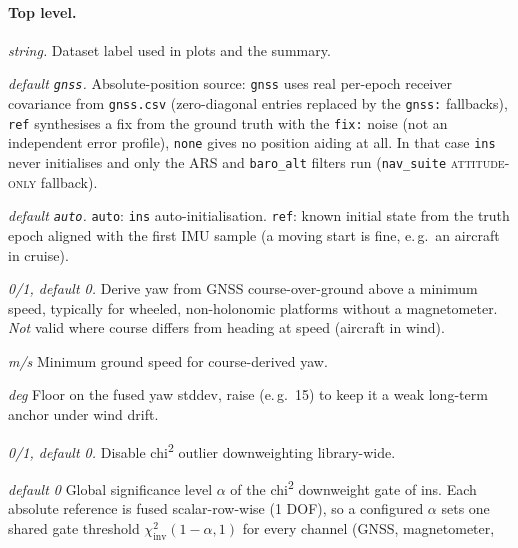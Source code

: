 \documentclass[11pt,a4paper]{article}
\newcommand{\code}[1]{\texttt{#1}}
\begin{document}
\paragraph{Top level.}
\begin{description}\setlength\itemsep{0pt}
  \item[\code{name}] \emph{string.} Dataset label used in plots and the summary.
  \item[\code{aiding}] \emph{default \code{gnss}.} Absolute-position source:
    \code{gnss} uses real per-epoch receiver covariance from \code{gnss.csv}
    (zero-diagonal entries replaced by the \code{gnss:} fallbacks), \code{ref}
    synthesises a fix from the ground truth with the \code{fix:} noise (not an
    independent error profile), \code{none} gives no position aiding at all.
    In that case \code{ins} never initialises and only the ARS and
    \code{baro\_\allowbreak{}alt} filters run (\code{nav\_\allowbreak{}suite}
    \textsc{attitude-only} fallback).
  \item[\code{init}] \emph{default \code{auto}.} \code{auto}: \code{ins}
    auto-initialisation. \code{ref}: known initial state from the truth epoch
    aligned with the first IMU sample (a moving start is fine, e.\,g.\ an aircraft
    in cruise).
  \item[\code{automotive\_\allowbreak{}mode}] \emph{0/1, default 0.} Derive yaw from GNSS
    course-over-ground above a minimum speed, typically for wheeled,
    non-holonomic platforms without a magnetometer. \emph{Not} valid where
    course differs from heading at speed (aircraft in wind).
  \item[\code{automotive\_\allowbreak{}min\_\allowbreak{}speed\_\allowbreak{}mps}] \emph{m/s}
    Minimum ground speed for course-derived yaw.
  \item[\code{automotive\_\allowbreak{}min\_\allowbreak{}yaw\_\allowbreak{}stddev\_\allowbreak{}deg}] \emph{deg}
    Floor on the fused yaw stddev, raise (e.\,g.\ 15) to keep it a weak long-term
    anchor under wind drift.
  \item[\code{chi2\_\allowbreak{}disable}] \emph{0/1, default 0.} Disable chi\textsuperscript{2}
    outlier downweighting library-wide.
  \item[\code{chi2\_\allowbreak{}reject\_\allowbreak{}alpha}] \emph{default 0} Global
    significance level $\alpha$ of the chi\textsuperscript{2} downweight
    gate of ins. Each absolute reference is fused scalar-row-wise (1 DOF), so a
    configured $\alpha$ sets one shared gate threshold
    $\chi^2_{\text{inv}}(1-\alpha, 1)$ for every channel (GNSS, magnetometer,

\end{description}
\end{document}
